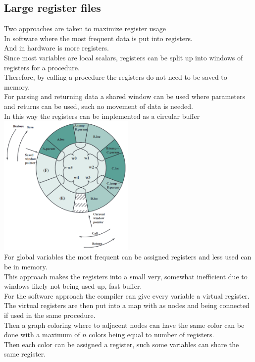\documentclass[12pt, a4paper]{article}
\begin{document}
		\subsection{Large register files}
			Two approaches are taken to maximize register usage\\
			In software where the most frequent data is put into registers.\\
			And in hardware is more registers.\\
			Since most variables are local scalars, registers can be split up into windows of registers for a procedure.\\
			Therefore, by calling a procedure the registers do not need to be saved to memory.\\
			For parsing and returning data a shared window can be used where parameters and returns can be used, such no movement of data is needed.\\
			In this way the registers can be implemented as a circular buffer\\
			\includegraphics[width=250px]{assets/registerBuffer.png}\\
			For global variables the most frequent can be assigned registers and less used can be in memory.\\
			This approach makes the registers into a small very, somewhat inefficient due to windows likely not being used up, fast buffer.\\[4mm]
			For the software approach the compiler can give every variable a virtual register.\\
			The virtual registers are then put into a map with as nodes and being connected if used in the same procedure.\\
			Then a graph coloring where to adjacent nodes can have the same color can be done with a maximum of $n$ colors being equal to number of registers.\\
			Then each color can be assigned a register, such some variables can share the same register.
\end{document}
